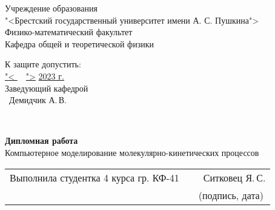 \thispagestyle{empty}

\begin{center}
    Учреждение образования \\
"<Брестский государственный университет имени А. С. Пушкина"> \\
Физико-математический факультет \\
Кафедра общей и теоретической физики \\


    \vspace{20pt}
\end{center}

\begin{flushright}
    \begin{minipage}{0.4\textwidth}
      К защите допустить:\\[0.1em]
      \underline{"<  $\quad$">\hspace*{0.2 cm}} \underline{\hspace{2 cm} 2023 г.\hspace*{0.3 cm}} \\ [0.4 em]
      Заведующий кафедрой \\[0.45em]
      \underline{\hspace*{2.8cm}}~Демидчик А.\,В.
    \end{minipage}\\[2.2em]

  \end{flushright}

\vspace{50pt}

  \begin{center}
    \textbf{Дипломная работа} \\
    \vspace{20pt}
  Компьютерное моделирование молекулярно-кинетических процессов

\end{center}
\vfill
    \vspace{20 pt}

\noindent
\begin{tabular}{lp{0.5em}l}
 Выполнила студентка 4 курса гр. КФ-41   && \hspace{-1 cm} \underline{\hspace{3.6cm}} ~Ситковец Я.\,С. \\                          &&   \hspace{- 0.5 cm} \footnotesize{(подпись, дата)} 
 \end{tabular}

